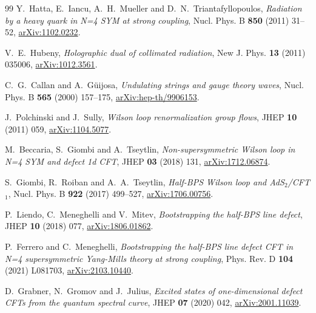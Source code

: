 \begin{thebibliography}{99}
Y.~Hatta, E.~Iancu, A.~H.~Mueller and D.~N.~Triantafyllopoulos,
\emph{Radiation by a heavy quark in N=4 SYM at strong coupling},
Nucl. Phys. B \textbf{850} (2011) 31--52,
\href{https://arxiv.org/abs/1102.0232}{arXiv:1102.0232}.

V.~E.~Hubeny,
\emph{Holographic dual of collimated radiation},
New J. Phys. \textbf{13} (2011) 035006,
\href{https://arxiv.org/abs/1012.3561}{arXiv:1012.3561}.

C.~G.~Callan and A.~G\"uijosa,
\emph{Undulating strings and gauge theory waves},
Nucl. Phys. B \textbf{565} (2000) 157--175,
\href{https://arxiv.org/abs/hep-th/9906153}{arXiv:hep-th/9906153}.

J.~Polchinski and J.~Sully,
\emph{Wilson loop renormalization group flows},
JHEP \textbf{10} (2011) 059,
\href{https://arxiv.org/abs/1104.5077}{arXiv:1104.5077}.

M.~Beccaria, S.~Giombi and A.~Tseytlin,
\emph{Non-supersymmetric Wilson loop in N=4 SYM and defect 1d CFT},
JHEP \textbf{03} (2018) 131,
\href{https://arxiv.org/abs/1712.06874}{arXiv:1712.06874}.

S.~Giombi, R.~Roiban and A.~A.~Tseytlin,
\emph{Half-BPS Wilson loop and AdS$_2$/CFT$_1$},
Nucl. Phys. B \textbf{922} (2017) 499--527,
\href{https://arxiv.org/abs/1706.00756}{arXiv:1706.00756}.

P.~Liendo, C.~Meneghelli and V.~Mitev,
\emph{Bootstrapping the half-BPS line defect},
JHEP \textbf{10} (2018) 077,
\href{https://arxiv.org/abs/1806.01862}{arXiv:1806.01862}.

P.~Ferrero and C.~Meneghelli,
\emph{Bootstrapping the half-BPS line defect CFT in N=4 supersymmetric Yang-Mills theory at strong coupling},
Phys. Rev. D \textbf{104} (2021) L081703,
\href{https://arxiv.org/abs/2103.10440}{arXiv:2103.10440}.

D.~Grabner, N.~Gromov and J.~Julius,
\emph{Excited states of one-dimensional defect CFTs from the quantum spectral curve},
JHEP \textbf{07} (2020) 042,
\href{https://arxiv.org/abs/2001.11039}{arXiv:2001.11039}.

\end{thebibliography}
